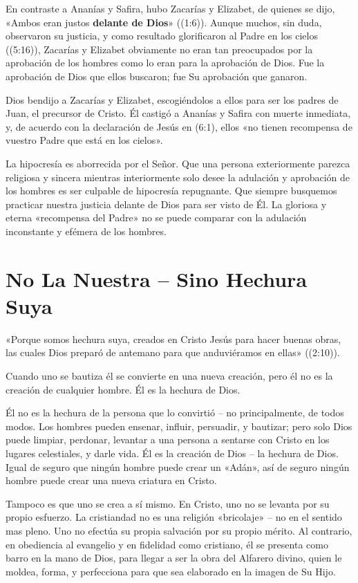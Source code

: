 \documentclass[12pt, twoside, openright]{book}
\begin{document}
En contraste a Ananías y Safira, hubo Zacarías y Elizabet, de quienes se dijo, «Ambos eran justos \textbf{delante de Dios}» ((1:6)). Aunque muchos, sin duda, observaron su justicia, y como resultado glorificaron al Padre en los cielos ((5:16)), Zacarías y Elizabet obviamente no eran tan preocupados por la aprobación de los hombres como lo eran para la aprobación de Dios. Fue la aprobación de Dios que ellos buscaron; fue Su aprobación que ganaron.

Dios bendijo a Zacarías y Elizabet, escogiéndolos a ellos para ser los padres de Juan, el precursor de Cristo. Él castigó a Ananías y Safira con muerte inmediata, y, de acuerdo con la declaración de Jesús en (6:1), ellos «no tienen recompensa de vuestro Padre que está en los cielos».

La hipocresía es aborrecida por el Señor. Que una persona exteriormente parezca religiosa y sincera mientras interiormente solo desee la adulación y aprobación de los hombres es ser culpable de hipocresía repugnante. Que siempre busquemos practicar nuestra justicia delante de Dios para ser visto de Él. La gloriosa y eterna «recompensa del Padre» no se puede comparar con la adulación inconstante y efémera de los hombres.

\section{No La Nuestra – Sino Hechura Suya}
«Porque somos hechura suya, creados en Cristo Jesús para hacer buenas obras, las cuales Dios preparó de antemano para que anduviéramos en ellas» ((2:10)).

Cuando uno se bautiza él se convierte en una nueva creación, pero él no es la creación de cualquier hombre. Él es la hechura de Dios.

Él no es la hechura de la persona que lo convirtió – no principalmente, de todos modos. Los hombres pueden ensenar, influir, persuadir, y bautizar; pero solo Dios puede limpiar, perdonar, levantar a una persona a sentarse con Cristo en los lugares celestiales, y darle vida. Él es la creación de Dios – la hechura de Dios. Igual de seguro que ningún hombre puede crear un «Adán», así de seguro ningún hombre puede crear una nueva criatura en Cristo.

Tampoco es que uno se crea a sí mismo. En Cristo, uno no se levanta por su propio esfuerzo. La cristiandad no es una religión «bricolaje» – no en el sentido mas pleno. Uno no efectúa su propia salvación por su propio mérito. Al contrario, en obediencia al evangelio y en fidelidad como cristiano, él se presenta como barro en la mano de Dios, para llegar a ser la obra del Alfarero divino, quien le moldea, forma, y perfecciona para que sea elaborado en la imagen de Su Hijo.
\end{document}
